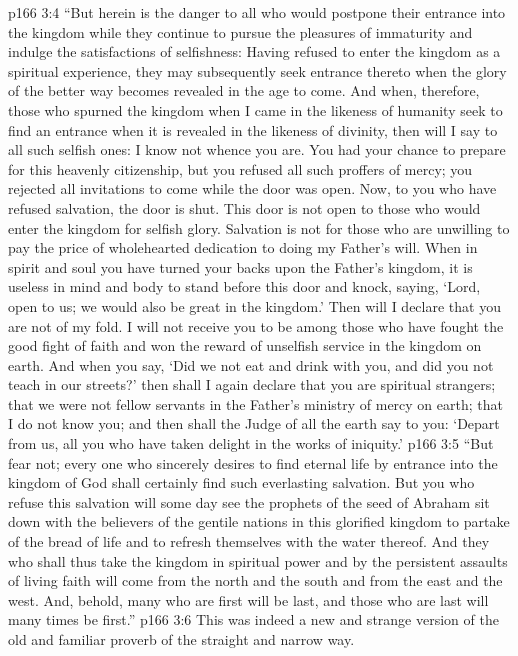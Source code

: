 \vs p166 3:4 “But herein is the danger to all who would postpone their entrance into the kingdom while they continue to pursue the pleasures of immaturity and indulge the satisfactions of selfishness: Having refused to enter the kingdom as a spiritual experience, they may subsequently seek entrance thereto when the glory of the better way becomes revealed in the age to come. And when, therefore, those who spurned the kingdom when I came in the likeness of humanity seek to find an entrance when it is revealed in the likeness of divinity, then will I say to all such selfish ones: I know not whence you are. You had your chance to prepare for this heavenly citizenship, but you refused all such proffers of mercy; you rejected all invitations to come while the door was open. Now, to you who have refused salvation, the door is shut. This door is not open to those who would enter the kingdom for selfish glory. Salvation is not for those who are unwilling to pay the price of wholehearted dedication to doing my Father’s will. When in spirit and soul you have turned your backs upon the Father’s kingdom, it is useless in mind and body to stand before this door and knock, saying, ‘Lord, open to us; we would also be great in the kingdom.’ Then will I declare that you are not of my fold. I will not receive you to be among those who have fought the good fight of faith and won the reward of unselfish service in the kingdom on earth. And when you say, ‘Did we not eat and drink with you, and did you not teach in our streets?’ then shall I again declare that you are spiritual strangers; that we were not fellow servants in the Father’s ministry of mercy on earth; that I do not know you; and then shall the Judge of all the earth say to you: ‘Depart from us, all you who have taken delight in the works of iniquity.’
\vs p166 3:5 \textcolor{ubdarkred}{“But fear not; every one who sincerely desires to find eternal life by entrance into the kingdom of God shall certainly find such everlasting salvation. But you who refuse this salvation will some day see the prophets of the seed of Abraham sit down with the believers of the gentile nations in this glorified kingdom to partake of the bread of life and to refresh themselves with the water thereof. And they who shall thus take the kingdom in spiritual power and by the persistent assaults of living faith will come from the north and the south and from the east and the west. And, behold, many who are first will be last, and those who are last will many times be first.”}
\vs p166 3:6 This was indeed a new and strange version of the old and familiar proverb of the straight and narrow way.
